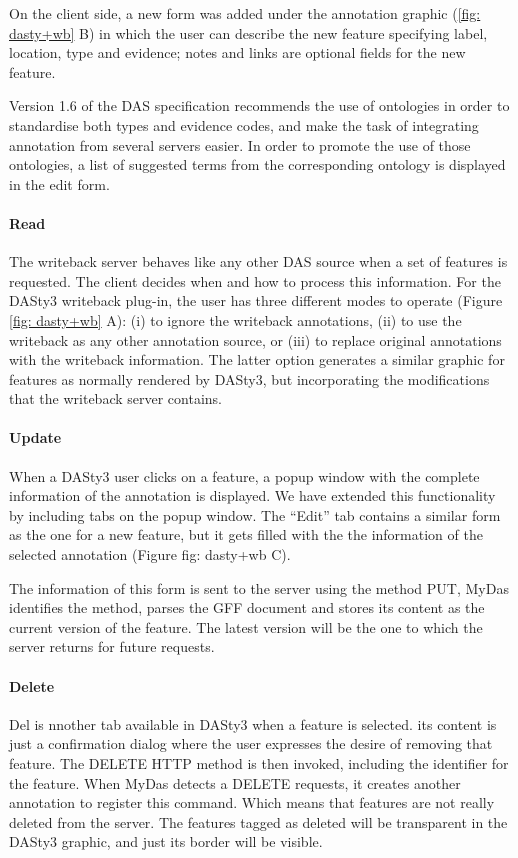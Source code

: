 On the client side, a new form was added under the annotation graphic (\ref{fig: dasty+wb} B) in which the user can describe the new feature specifying label, location, type and evidence; notes and links are optional fields for the new feature. 

Version 1.6 of the DAS specification recommends the use of ontologies in order to standardise both types and evidence codes, and make the task of integrating annotation from several servers easier. In order to promote the use of those ontologies, a list of suggested terms from the corresponding ontology is displayed in the edit form.
  
\paragraph{Read}
The writeback server behaves like any other DAS source when a set of features is requested. The client decides when and how to process this information. For the DASty3 writeback plug-in, the user has three different modes to operate (Figure \ref{fig: dasty+wb} A): (i) to ignore the writeback annotations, (ii) to use the writeback as any other annotation source, or (iii) to replace original annotations with the writeback information. The latter option generates a similar graphic for features as normally rendered by DASty3, but incorporating the modifications that the writeback server contains. 

\paragraph{Update}
When a DASty3 user clicks on a feature, a popup window with the complete information of the annotation is displayed. We have extended this functionality by including tabs on the popup window. The ``Edit'' tab contains a similar form as the one for a new feature, but it gets filled with the the information of the selected annotation (Figure {fig: dasty+wb} C). 

The information of this form is sent to the server using the method PUT, MyDas identifies the method, parses the GFF document and stores its content as the current version of the feature. The latest version will be the one to which the server returns for future requests.

\paragraph{Delete}
Del is nnother tab available in DASty3 when a feature is selected. its content is just a confirmation dialog where the user expresses the desire of removing that feature. The DELETE HTTP method is then invoked, including the identifier for the feature. When MyDas detects a DELETE requests, it creates another annotation to register this command.  Which means that features are not really deleted from the server. The features tagged as deleted will be transparent in the DASty3 graphic, and just its border will be visible.


